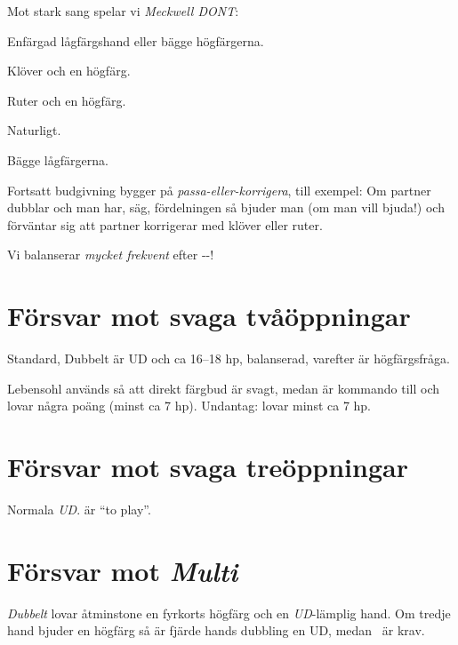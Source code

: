 Mot stark sang spelar vi \emph{Meckwell DONT}: 

\bbe
\item[Dubbelt] Enfärgad lågfärgshand eller bägge högfärgerna.
\item[\kl{2}] Klöver och en högfärg.
\item[\ru{2}] Ruter och en högfärg.
\item[\ho{2}] Naturligt.
\item[\NT{2}] Bägge lågfärgerna.
  \ebe

  Fortsatt budgivning bygger på \emph{passa-eller-korrigera}, till exempel:
Om partner dubblar  och man har, säg, fördelningen 
så bjuder man (om man vill bjuda!)  och förväntar sig att partner
korrigerar med klöver eller ruter.

Vi balanserar {\em mycket frekvent} efter -\pass-\pass!

\section{Försvar mot svaga två\-öpp\-ning\-ar}


Standard, Dubbelt är UD och  ca 16--18 hp, balanserad, varefter
 är högfärgsfråga.
 

Lebensohl används så att direkt färgbud är svagt, medan  är
kommando till  och lovar några poäng (minst ca 7 hp). Undantag:
 lovar minst ca 7 hp.

\section{Försvar mot svaga tre\-öpp\-ning\-ar}

Normala \emph{UD}.  är ``to play''.

\section{Försvar mot {\em Multi} }

{\em Dubbelt} lovar åtminstone en fyrkorts högfärg och en {\em
UD}-lämplig hand. Om tredje hand bjuder en högfärg så är fjärde hands
dubbling en UD, medan \pass\ är krav.

